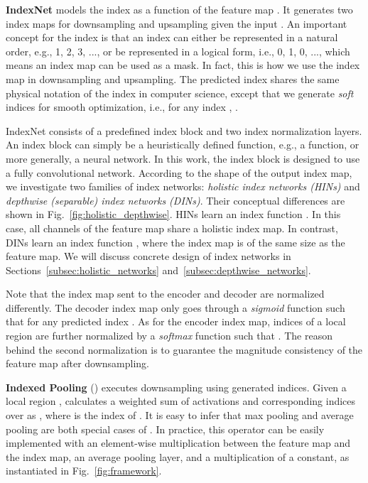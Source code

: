 \documentclass[10pt,twocolumn,letterpaper]{article}
\begin{document}
\noindent\textbf{IndexNet} models the index as a function of the feature map . It generates two index maps for downsampling and upsampling given the input . An important concept for the index is that an index can either be represented in a natural order, e.g., 1, 2, 3, ..., or be represented in a logical form, i.e., 0, 1, 0, ..., which means an index map can be used as a mask. In fact, this is how we use the index map in downsampling and upsampling. The predicted index shares the same physical notation of the index in computer science, except that we generate \textit{soft} indices for smooth optimization, i.e., for any index , .

IndexNet consists of a predefined index block and two index normalization layers. An index block can  simply be a heuristically defined function, e.g., a   function, or more generally, a neural network. In this work, the index block is designed to use a fully convolutional network. According to the shape of the output index map, we investigate two families of index networks: \textit{holistic index networks (HINs)} and \textit{depthwise (separable) index networks (DINs)}. Their conceptual differences are shown in Fig.~\ref{fig:holistic_depthwise}. HINs learn an index function . In this case, all channels of the feature map share a holistic index map. In contrast, DINs learn an index function , where the index map is of the same size as the feature map. We will discuss concrete design of index networks in Sections~\ref{subsec:holistic_networks} and~\ref{subsec:depthwise_networks}.

Note that the index map sent to the encoder and decoder are normalized differently. The decoder index map only goes through a \textit{sigmoid} function such that for any predicted index . As for the encoder index map, indices of a local region  are further normalized by a \textit{softmax} function such that . The reason behind the second normalization is to guarantee the magnitude consistency of the feature map after downsampling.

\vspace{5pt}
\noindent\textbf{Indexed Pooling} () executes downsampling using generated indices. Given a local region ,  calculates a weighted sum of activations and corresponding indices over  as , where  is the index of . It is easy to infer that max pooling and average pooling are both special cases of . In practice, this operator can be easily implemented with an element-wise multiplication between the feature map and the index map, an average pooling layer, and a multiplication of a constant, as instantiated in Fig.~\ref{fig:framework}.
\end{document}
